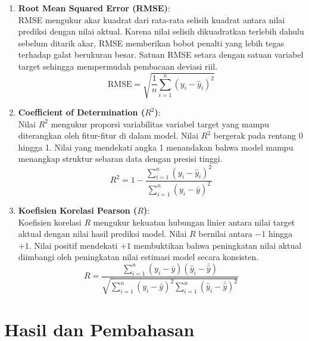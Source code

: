 \documentclass[a4paper,oneside,12pt]{report}
\begin{document}
\begin{enumerate}
    \item \textbf{Root Mean Squared Error (RMSE)}: \\
    RMSE mengukur akar kuadrat dari rata-rata selisih kuadrat antara nilai prediksi dengan nilai aktual. Karena nilai selisih dikuadratkan terlebih dahulu sebelum ditarik akar, RMSE memberikan bobot penalti yang lebih tegas terhadap galat berukuran besar. Satuan RMSE setara dengan satuan variabel target sehingga mempermudah pembacaan deviasi riil.
    \begin{equation}
        \text{RMSE} = \sqrt{\frac{1}{n}\sum_{i=1}^n (y_i - \hat{y}_i)^2}
    \end{equation}

    \item \textbf{Coefficient of Determination ($R^2$)}: \\
    Nilai $R^2$ mengukur proporsi variabilitas variabel target yang mampu diterangkan oleh fitur-fitur di dalam model. Nilai $R^2$ bergerak pada rentang 0 hingga 1. Nilai yang mendekati angka 1 menandakan bahwa model mampu menangkap struktur sebaran data dengan presisi tinggi.
    \begin{equation}
        R^2 = 1 - \frac{\sum_{i=1}^n (y_i - \hat{y}_i)^2}{\sum_{i=1}^n (y_i - \bar{y})^2}
    \end{equation}

    \item \textbf{Koefisien Korelasi Pearson ($R$)}: \\
    Koefisien korelasi $R$ mengukur kekuatan hubungan linier antara nilai target aktual dengan nilai hasil prediksi model. Nilai $R$ bernilai antara $-1$ hingga $+1$. Nilai positif mendekati $+1$ membuktikan bahwa peningkatan nilai aktual diimbangi oleh peningkatan nilai estimasi model secara konsisten.
    \begin{equation}
        R = \frac{\sum_{i=1}^n (y_i - \bar{y})(\hat{y}_i - \bar{\hat{y}})}{\sqrt{\sum_{i=1}^n (y_i - \bar{y})^2 \sum_{i=1}^n (\hat{y}_i - \bar{\hat{y}})^2}}
    \end{equation}
\end{enumerate}
\clearpage

\chapter{Hasil dan Pembahasan}
\end{document}
